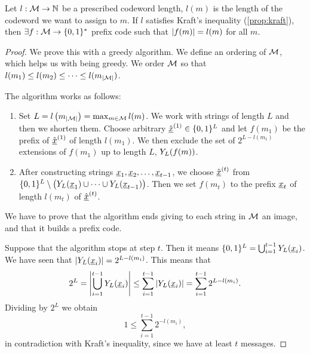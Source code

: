 \begin{thm}[Kraft]
	Let $l : \mathcal{M} \to \mathbb{N}$ be a prescribed codeword length, \ie $l(m)$ is the length of the codeword we want to assign to $m$.
	If $l$ satisfies Kraft's inequality (\cref{prop:kraft}), then 
	$\exists f : \mathcal{M} \to \{0, 1\}^*$ prefix code such that $\left|{f(m)}\right| = l(m)$ for all $m$.
\end{thm}

\begin{proof}
	We prove this with a greedy algorithm.
	We define an ordering of $\mathcal{M}$, which helps us with being greedy.
	We order $\mathcal{M}$ so that $l(m_1) \le l(m_2) \le \dots \le l(m_{\left|{\mathcal{M}}\right|})$.

	The algorithm works as follows:
	\begin{enumerate}
		\item Set $L = l \left( m_{\left|{\mathcal{M}}\right|} \right) = \max_{m \in \mathcal{M}} l(m)$.
			We work with strings of length $L$ and then we shorten them.
			Choose arbitrary $\hat{\underline{x}}^{(1)} \in \{0, 1\}^L$ and let $f(m_1)$ be the prefix of $\hat{\underline{x}}^{(1)}$ of length $l(m_1)$.
			We then exclude the set of $2^{L - l(m_1)}$ extensions of $f(m_1)$ up to length $L$, \ie $Y_L(f(m))$.

		\item After constructing strings $\underline{x}_1,\underline{x}_2, \dots, \underline{x}_{t-1}$, we choose $\hat{\underline{x}}^{(t)}$ from $\{0, 1\}^L \setminus \left( Y_L(\underline{x}_1) \cup \dots \cup Y_L(\underline{x}_{t-1}) \right)$.
			Then we set $f(m_t)$ to the prefix $\underline{x}_t$ of length $l(m_t)$ of $\hat{\underline{x}}^{(t)}$.
	\end{enumerate}

	We have to prove that the algorithm ends giving to each string in $\mathcal{M}$ an image, and that it builds a prefix code.

	Suppose that the algorithm stops at step $t$.
	Then it means $\{0, 1\}^L = \bigcup_{i = 1}^{t-1} Y_L(\underline{x}_i)$. We have seen that $\left|{Y_L(\underline{x}_i)}\right| = 2^{L - l(m_i)}$. This means that
	\begin{equation*}
		2^L
		=
		\left|{\bigcup_{i = 1}^{t-1} Y_L(\underline{x}_i)}\right|
		\leq
		\sum_{i = 1}^{t-1} \left|{Y_L(\underline{x}_i)}\right|
		=
		\sum_{i = 1}^{t-1} 2^{L-l(m_i)}.
	\end{equation*}
	Dividing by $2^L$ we obtain
	\begin{equation*}
		1 \leq \sum_{i = 1}^{t-1} 2^{-l(m_i)},
	\end{equation*}
	in contradiction with Kraft's inequality, since we have at least $t$ messages. 


\end{proof}
